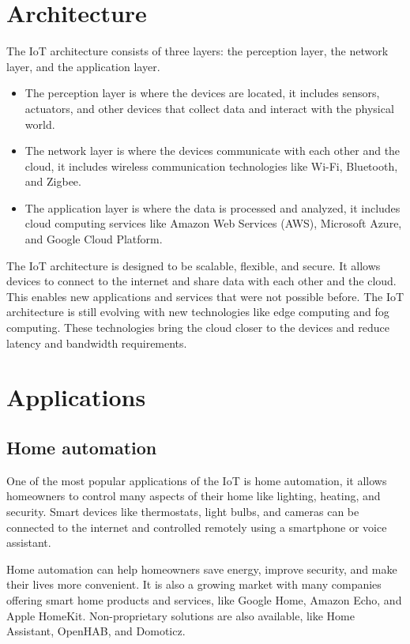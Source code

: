 \section{Architecture}
\label{sec:iot-architecture}

The IoT architecture consists of three layers: the perception layer, the network layer, and the application layer.
\begin{itemize}
	\item The perception layer is where the devices are located, it includes sensors, actuators, and other devices that
	      collect data and interact with the physical world.
	\item The network layer is where the devices communicate with each other and the cloud, it includes wireless
	      communication technologies like Wi-Fi, Bluetooth, and Zigbee.
	\item The application layer is where the data is processed and analyzed, it includes cloud computing services like
	      Amazon Web Services (AWS), Microsoft Azure, and Google Cloud Platform.
\end{itemize}

The IoT architecture is designed to be scalable, flexible, and secure. It allows devices to connect to the internet and
share data with each other and the cloud. This enables new applications and services that were not possible before. The
IoT architecture is still evolving with new technologies like edge computing and fog computing. These technologies bring
the cloud closer to the devices and reduce latency and bandwidth requirements.

\section{Applications}
\label{sec:iot-applications}

\subsection{Home automation}
\label{subsec:iot-home-automation}

One of the most popular applications of the IoT is home automation, it allows homeowners to control many aspects of their
home like lighting, heating, and security. Smart devices like thermostats, light bulbs, and cameras can be connected to
the internet and controlled remotely using a smartphone or voice assistant.

Home automation can help homeowners save energy, improve security, and make their lives more convenient. It is also a
growing market with many companies offering smart home products and services, like Google Home, Amazon Echo, and Apple
HomeKit. Non-proprietary solutions are also available, like Home Assistant, OpenHAB, and Domoticz.


